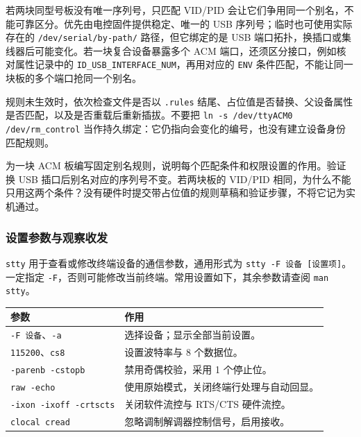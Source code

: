 \begin{note}
若两块同型号板没有唯一序列号，只匹配 VID/PID 会让它们争用同一个别名，不能可靠区分。优先由电控固件提供稳定、唯一的 USB 序列号；临时也可使用实际存在的 \texttt{/dev/serial/by-path/} 路径，但它绑定的是 USB 端口拓扑，换插口或集线器后可能变化。若一块复合设备暴露多个 ACM 端口，还须区分接口，例如核对属性记录中的 \texttt{ID\_USB\_INTERFACE\_NUM}，再用对应的 \texttt{ENV} 条件匹配，不能让同一块板的多个端口抢同一个别名。
\end{note}

规则未生效时，依次检查文件是否以 \texttt{.rules} 结尾、占位值是否替换、父设备属性是否匹配，以及是否重载后重新插拔。不要把 \texttt{ln -s /dev/ttyACM0 /dev/rm\_control} 当作持久绑定：它仍指向会变化的编号，也没有建立设备身份匹配规则。

\begin{exercise}\label{ex:serial-udev}
为一块 ACM 板编写固定别名规则，说明每个匹配条件和权限设置的作用。验证换 USB 插口后别名对应的序列号不变。若两块板的 VID/PID 相同，为什么不能只用这两个条件？没有硬件时提交带占位值的规则草稿和验证步骤，不将它记为实机通过。
\end{exercise}

\subsubsection{设置参数与观察收发}

\texttt{stty} 用于查看或修改终端设备的通信参数，通用形式为 \texttt{stty -F 设备 [设置项]}。一定指定 \texttt{-F}，否则可能修改当前终端。常用设置如下，其余参数请查阅 \texttt{man stty}。

\begin{center}
\begin{tabular}{p{}p{}}
\toprule[1.5pt]
参数 & 作用 \\
\midrule[1pt]
\texttt{-F 设备}、\texttt{-a} & 选择设备；显示全部当前设置。\\
\texttt{115200}、\texttt{cs8} & 设置波特率与 8 个数据位。\\
\texttt{-parenb -cstopb} & 禁用奇偶校验，采用 1 个停止位。\\
\texttt{raw -echo} & 使用原始模式，关闭终端行处理与自动回显。\\
\texttt{-ixon -ixoff -crtscts} & 关闭软件流控与 RTS/CTS 硬件流控。\\
\texttt{clocal cread} & 忽略调制解调器控制信号，启用接收。\\
\bottomrule[1.5pt]
\end{tabular}
\end{center}


